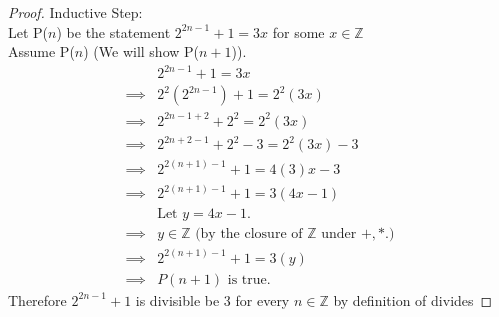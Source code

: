 \documentclass[11 pt]{article}
\theoremstyle{definition}
\theoremstyle{definition}
\def\ZZ{\mathbb{Z}}
\begin{document}
\begin{enumerate}
\begin{proof}
            Inductive Step: \\
            Let P($n$) be the statement $2^{2n-1} + 1 = 3x$ for some $x \in \ZZ$\\
            Assume P($n$) (We will show P($n+1$)).
            \begin{align}
                &2^{2n-1} + 1 = 3x\\
                \implies &2^2(2^{2n-1}) + 1 = 2^2(3x)\\
                \implies &2^{2n-1+2}+2^2 = 2^2(3x)\\
                \implies &2^{2n+2-1}+2^2 -3 = 2^2(3x) -3\\
                \implies &2^{2(n+1)-1}+1 = 4(3)x-3\\
                \implies &2^{2(n+1)-1}+1 = 3(4x-1)\\
                         & \text{Let $y=4x-1$.}\\
                \implies & \text{$y \in \ZZ$ (by the closure of $\ZZ$ under $+,*$.)}\\
                \implies &2^{2(n+1)-1}+1 = 3(y)\\
                \implies & P(n+1) \text{ is true.}
            \end{align}%
            Therefore $2^{2n-1} + 1$ is divisible be 3 for every $n \in \ZZ$ by definition of divides
        \end{proof}
        \pagebreak%


\end{enumerate}
\end{document}

